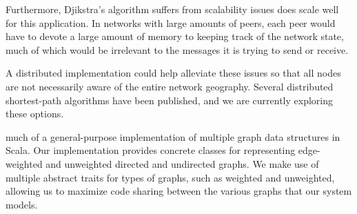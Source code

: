 \documentclass[a4paper,nobib]{tufte-handout}
\begin{document}
Furthermore, Djikstra's algorithm suffers from scalability issues does scale well for this application. In networks with large amounts of peers, each peer would have to devote a large amount of memory to keeping track of the network state, much of which would be irrelevant to the messages it is trying to send or receive.

A distributed implementation could help alleviate these issues so that all nodes are not necessarily aware of the entire network geography. Several distributed shortest-path algorithms have been published, and we are currently exploring these options.

 much of a general-purpose implementation of multiple graph data structures in Scala. Our implementation provides concrete classes for representing edge-weighted and unweighted directed and undirected graphs. We make use of multiple abstract traits for types of graphs, such as weighted and unweighted, allowing us to maximize code sharing between the various graphs that our system models.
\end{document}
